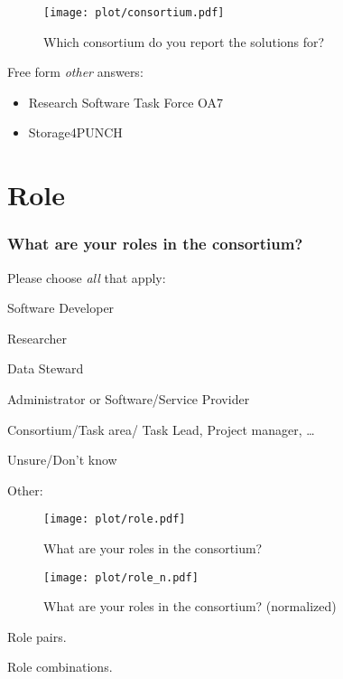 \documentclass[headsepline,titlepage,twoside,12pt,toc=flat,headings=normal]{scrreprt}
\newcommand{\question}[1]{\subsubsection{#1}}
\newcommand{\otherbox}{\fbox{\phantom{This is how big an answer would be.}}}
\begin{document}
\begin{figure}[h!]
\caption{Which consortium do you report the solutions for?}
\label{fig:consortium}
\texttt{[image: plot/consortium.pdf]}
\end{figure}

Free form \emph{other} answers:
\begin{itemize}
\item Research Software Task Force OA7
\item Storage4PUNCH
\end{itemize}

\newpage
\section{Role}

\question{What are your roles in the consortium?}
Please choose \emph{all} that apply:

\begin{answers}
\item Software Developer
\item Researcher
\item Data Steward
\item Administrator or Software/Service Provider
\item Consortium/Task area/ Task Lead, Project manager, \ldots{}
\item Unsure/Don't know
\item Other: \otherbox
\end{answers}

\begin{figure}[h!]
\caption{What are your roles in the consortium?}
\label{fig:role}
\texttt{[image: plot/role.pdf]}
\end{figure}

\begin{figure}[h!]
\caption{What are your roles in the consortium? (normalized)}
\label{fig:role_n}
\texttt{[image: plot/role\_n.pdf]}
\end{figure}

\begin{table}
\caption{Role pairs.}
\label{tab:role_pairs}

\end{table}

\begin{table}
\caption{Role combinations.}
\label{tab:role_combinations}

\end{table}
\end{document}
